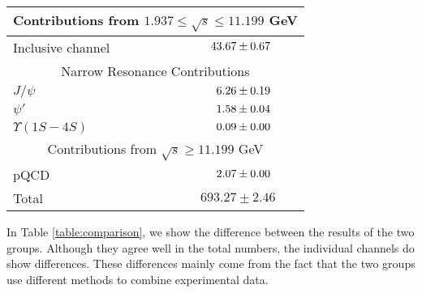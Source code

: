 \begin{table}
\begin{center}
\begin{tabular}{|l|c|}
\hline 
\multicolumn{2}{|c|}{Contributions from
  $1.937 \leq \sqrt{s} \leq 11.199$ GeV} \\
\hline
Inclusive channel & $\hpz43.67 \pm 0.67$  \\ %
\hline
\multicolumn{2}{|c|}{Narrow Resonance Contributions} \\
\hline
$J/\psi$          & $\hpzz6.26 \pm 0.19$  \\ %
$\psi'$           & $\hpzz1.58 \pm 0.04$  \\ %
$\Upsilon(1S-4S)$ & $\hpzz0.09 \pm 0.00$  \\ %
\hline 
\multicolumn{2}{|c|}{Contributions from $\sqrt{s} \geq 11.199$ GeV} \\
\hline
pQCD              & $\hpzz2.07 \pm 0.00$  \\ %
\hline\hline
Total             & $693.27 \pm 2.46$     \\ %
\hline
\end{tabular} \end{center} \end{table}


In Table \ref{table:comparison}, we show the difference
between the results of the two groups.  Although they 
agree well in the total numbers, the individual channels
do show differences.  These differences mainly come from the
fact that the two groups use different methods to combine
experimental data.


